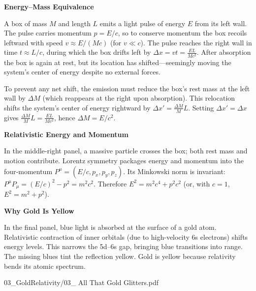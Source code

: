 \begin{SideNotePage}{
  \textbf{Energy–Mass Equivalence} \par
  A box of mass \(M\) and length \(L\) emits a light pulse of energy \(E\) from its left wall. The pulse carries momentum \(p = E/c\), so to conserve momentum the box recoils leftward with speed \(v \approx E/(M c)\) (for \(v \ll c\)). The pulse reaches the right wall in time \(t \approx L/c\), during which the box drifts left by \(\Delta x = v t = \frac{E L}{M c^2}\). After absorption the box is again at rest, but its location has shifted—seemingly moving the system’s center of energy despite no external forces.

  To prevent any net shift, the emission must reduce the box’s rest mass at the left wall by \(\Delta M\) (which reappears at the right upon absorption). This relocation shifts the system’s center of energy rightward by \(\Delta x' = \frac{\Delta M}{M} L\). Setting \(\Delta x' = \Delta x\) gives \(\frac{\Delta M}{M} L = \frac{E L}{M c^2}\), hence \(\Delta M = E/c^2\).
 
  \vspace{0.5em}
  \textbf{Relativistic Energy and Momentum} \par
  In the middle-right panel, a massive particle crosses the box; both rest mass and motion contribute. Lorentz symmetry packages energy and momentum into the four‑momentum \(P^\mu = (E/c, p_x, p_y, p_z)\). Its Minkowski norm is invariant: \(P^\mu P_\mu = (E/c)^2 - p^2 = m^2 c^2\). Therefore \(E^2 = m^2 c^4 + p^2 c^2\) (or, with \(c=1\), \(E^2 = m^2 + p^2\)).

  \vspace{0.5em}
  \textbf{Why Gold Is Yellow} \par
  In the final panel, blue light is absorbed at the surface of a gold atom. Relativistic contraction of inner orbitals (due to high-velocity 6s electrons) shifts energy levels. This narrows the 5d–6s gap, bringing blue transitions into range. The missing blues tint the reflection yellow. Gold is yellow because relativity bends its atomic spectrum.
}{03_GoldRelativity/03_ All That Gold Glitters.pdf}
\end{SideNotePage}
